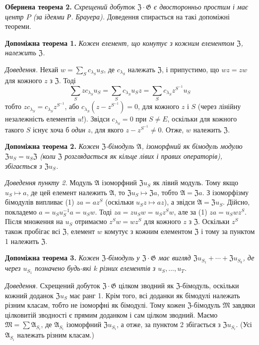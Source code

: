 \documentclass[11pt]{article}
\begin{document}
\noindent\textbf{Обернена теорема 2.} \emph{Схрещений добуток \(\mathfrak Z\cdot\mathfrak G\) є двосторонньо простим і має центр \(P\) (за ідеями Р. Брауера).} Доведення спирається на такі допоміжні теореми.

\noindent\textbf{Допоміжна теорема 1.} \emph{Кожен елемент, що комутує з кожним елементом \(\mathfrak Z\), належить \(\mathfrak Z\).}

\noindent\emph{Доведення.} Нехай \(w=\sum_S c_{\lambda_S}u_S\), де \(c_{\lambda_S}\) належать \(\mathfrak Z\), і припустимо, що \(wz=zw\) для кожного \(z\) з \(\mathfrak Z\). Тоді
\[
\sum_S zc_{\lambda_S}u_S
 =\sum_S c_{\lambda_S}u_Sz
 =\sum_S c_{\lambda_S}z^{S^{-1}}u_S
\]
тобто \(zc_{\lambda_S}=c_{\lambda_S}z^{S^{-1}}\), або \(c_{\lambda_S}(z-z^{S^{-1}})=0\), для кожного \(z\) і \(S\) (через лінійну незалежність елементів \(u\)!). Звідси \(c_{\lambda_S}=0\) при \(S\neq E\), оскільки для кожного такого \(S\) існує хоча б \emph{один} \(z\), для якого \(z-z^{S^{-1}}\neq0\). Отже, \(w\) належить \(\mathfrak Z\).

\noindent\textbf{Допоміжна теорема 2.} \emph{Кожен \(\mathfrak Z\)-бімодуль \(\mathfrak A\), ізоморфний як бімодуль модулю \(\mathfrak Zu_S=u_S\mathfrak Z\) (коли \(\mathfrak Z\) розглядається як кільце лівих і правих операторів), збігається з \(\mathfrak Zu_S\).}

\noindent\emph{Доведення пункту 2.} Модуль \(\mathfrak A\) ізоморфний \(\mathfrak Zu_S\) як лівий модуль. Тому якщо \(u_S\mapsto a\), де цей елемент належить \(\mathfrak A\), то \(\mathfrak Zu_S\mapsto\mathfrak Za\), тобто \(\mathfrak A=\mathfrak Za\). З ізоморфізму бімодулів випливає (1) \(za=az^S\) (оскільки \(u_Sz\mapsto az\)), а звідси \(\mathfrak A=\mathfrak Zu_S\). Дійсно, покладемо \(a=u_Su_S^{-1}a=u_Sw\). Тоді \(za=zu_Sw=u_Sz^Sw\), але за (1) \(za=u_Swz^S\). Після множення на \(u_S\) отримаємо \(z^Sw=wz^S\) для кожного \(z\) з \(\mathfrak Z\). Оскільки \(z^S\) також пробігає всі \(\mathfrak Z\), елемент \(w\) комутує з кожним елементом \(\mathfrak Z\) і тому за пунктом 1 належить \(\mathfrak Z\).

\noindent\textbf{Допоміжна теорема 3.} \emph{Кожен \(\mathfrak Z\)-бімодуль у \(\mathfrak Z\cdot\mathfrak G\) має вигляд \(\mathfrak Zu_{S_1}+\cdots+\mathfrak Zu_{S_k}\), де через \(u_{S_1}\) позначено будь-які \(k\) різних елементів з \(u_S,\ldots,u_T\).}

\noindent\emph{Доведення.} Схрещений добуток \(\mathfrak Z\cdot\mathfrak G\) цілком зводний як \(\mathfrak Z\)-бімодуль, оскільки кожний доданок \(\mathfrak Zu_S\) має ранг 1. Крім того, всі доданки як бімодулі належать різним класам, тобто не ізоморфні як бімодулі. Тому кожен \(\mathfrak Z\)-бімодуль \(\mathfrak M\) завдяки цілковитій зводності є прямим доданком і сам цілком зводний. Маємо \(\mathfrak M=\sum\mathfrak A_{S_i}\), де \(\mathfrak A_{S_i}\) ізоморфний \(\mathfrak Zu_{S_i}\), а отже, за пунктом 2 збігається з \(\mathfrak Zu_{S_i}\). (Усі \(\mathfrak A_{S_i}\) належать різним класам.)
\end{document}
